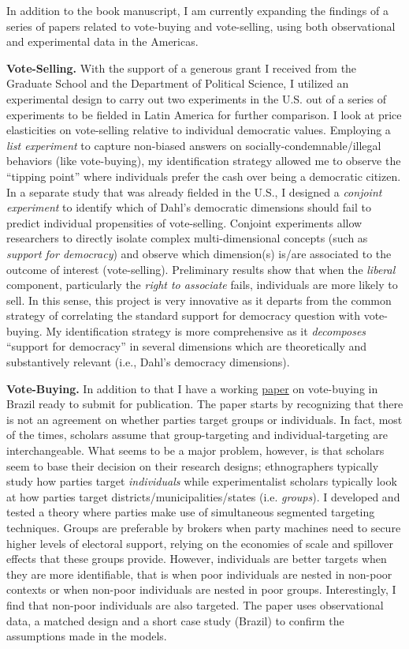 \documentclass[10pt,stdletter,dateno,sigleft]{newlfm} %
\begin{document}
\begin{newlfm}
In addition to the book manuscript, I am currently expanding the findings of a series of papers related to vote-buying and vote-selling, using both observational and experimental data in the Americas. 

{\bf Vote-Selling.} With the support of a generous grant I received from the Graduate School and the Department of Political Science, I utilized an experimental design to carry out two experiments in the U.S. out of a series of experiments to be fielded in Latin America for further comparison. I look at price elasticities on vote-selling relative to individual democratic values. Employing a \emph{list experiment} to capture non-biased answers on socially-condemnable/illegal behaviors (like vote-buying), my identification strategy allowed me to observe the ``tipping point'' where individuals prefer the cash over being a democratic citizen. In a separate study that was already fielded in the U.S., I designed a \emph{conjoint experiment} to identify which of Dahl's democratic dimensions should fail to predict individual propensities of vote-selling. Conjoint experiments allow researchers to directly isolate complex multi-dimensional concepts (such as \emph{support for democracy}) and observe which dimension(s) is/are associated to the outcome of interest (vote-selling). Preliminary results show that when the \emph{liberal} component, particularly the \emph{right to associate} fails, individuals are more likely to sell. In this sense, this project is very innovative as it departs from the common strategy of correlating the standard support for democracy question with vote-buying. My identification strategy is more comprehensive as it \emph{decomposes} ``support for democracy'' in several dimensions which are theoretically and substantively relevant (i.e., Dahl's democracy dimensions). 

{\bf Vote-Buying.} In addition to that I have a working \href{https://github.com/hbahamonde/Clientelism_paper/raw/master/Bahamonde_Clientelism_Paper.pdf}{paper} on vote-buying in Brazil ready to submit for publication. The paper starts by recognizing that there is not an agreement on whether parties target groups or individuals. In fact, most of the times, scholars assume that group-targeting and individual-targeting are interchangeable. What seems to be a major problem, however, is that scholars seem to base their decision on their research designs; ethnographers typically study how parties target \emph{individuals} while experimentalist scholars typically look at how parties target districts/municipalities/states (i.e. \emph{groups}). I developed and tested a theory where parties make use of simultaneous segmented targeting techniques. Groups are preferable by brokers when party machines need to secure higher levels of electoral support, relying on the economies of scale and spillover effects that these groups provide. However, individuals are better targets when they are more identifiable, that is when poor individuals are nested in non-poor contexts or when non-poor individuals are nested in poor groups. Interestingly, I find that non-poor individuals are also targeted. The paper uses observational data, a matched design and a short case study (Brazil) to confirm the assumptions made in the models.


\end{newlfm}
\end{document}
